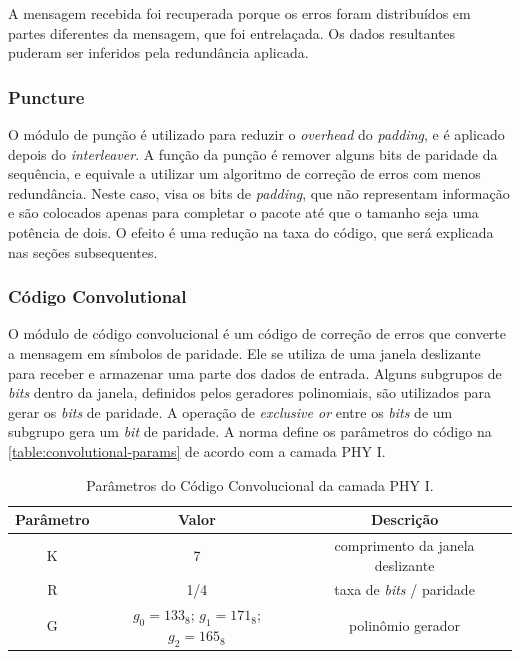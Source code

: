	A mensagem recebida foi recuperada porque os erros foram distribuídos em partes diferentes da mensagem, que foi entrelaçada. Os dados resultantes puderam ser inferidos pela redundância aplicada.

	\subsubsection{Puncture}

	O módulo de punção é utilizado para reduzir o \textit{overhead} do \textit{padding}, e é aplicado depois do \textit{interleaver}. A função da punção é remover alguns bits de paridade da sequência, e equivale a utilizar um algoritmo de correção de erros com menos redundância. Neste caso, visa os bits de \textit{padding}, que não representam informação e são colocados apenas para completar o pacote até que o tamanho seja uma potência de dois. O efeito é uma redução na taxa do código, que será explicada nas seções subsequentes.

	\subsubsection{Código Convolutional}

	O módulo de código convolucional é um código de correção de erros que converte a mensagem em símbolos de paridade. Ele se utiliza de uma janela deslizante para receber e armazenar uma parte dos dados de entrada. Alguns subgrupos de \textit{bits} dentro da janela, definidos pelos geradores polinomiais, são utilizados para gerar os \textit{bits} de paridade. A operação de \textit{exclusive or} entre os \textit{bits} de um subgrupo gera um \textit{bit} de paridade. A norma define os parâmetros do código na \autoref{table:convolutional-params} de acordo com a camada PHY I.

	\begin{table}[ht]
		\caption{Parâmetros do Código Convolucional da camada PHY I.}
		\centering
		\begin{tabular}{c c c}
			\hline
			Parâmetro & Valor & Descrição \\ \hline
			K & 7 & comprimento da janela deslizante \\
			R & 1/4 & taxa de \textit{bits} / paridade \\
			G & $g_{0} = 133_{8}$; $g_{1} = 171_{8}$; $g_{2} = 165_{8}$ & polinômio gerador \\ \hline
		\end{tabular}
		\label{table:convolutional-params}
	\end{table}

